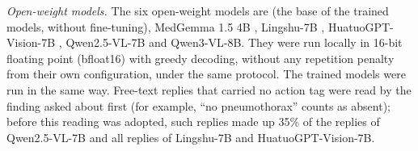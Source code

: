 \emph{Open-weight models.} The six open-weight models are \base{} (the base of the trained models, without fine-tuning), MedGemma 1.5 4B \citep{sellergren2025medgemma}, Lingshu-7B \citep{xu2025lingshu}, HuatuoGPT-Vision-7B \citep{chen2024huatuogpt}, Qwen2.5-VL-7B \citep{bai2025qwen25vl} and Qwen3-VL-8B. They were run locally in 16-bit floating point (bfloat16) with greedy decoding, without any repetition penalty from their own configuration, under the same protocol. The trained models were run in the same way. Free-text replies that carried no action tag were read by the finding asked about first (for example, ``no pneumothorax'' counts as absent); before this reading was adopted, such replies made up 35\% of the replies of Qwen2.5-VL-7B and all replies of Lingshu-7B and HuatuoGPT-Vision-7B.
